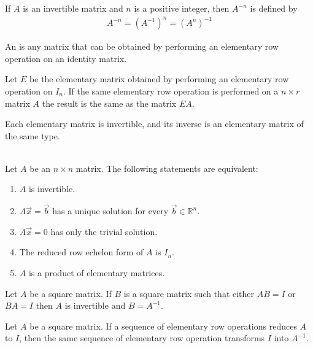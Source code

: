\documentclass{article}
\begin{document}
\begin{definition}
    If $A$ is an invertible matrix and $n$ is a positive integer, then $A^{-n}$ is defined by 
    \begin{gather*}
        A^{-n} = (A^{-1})^n = (A^n)^{-1}
    \end{gather*}
\end{definition}
\begin{definition}
    An  is any matrix that can be obtained by performing an elementary row operation on an identity matrix. 
\end{definition}
\begin{theorem}
    Let $E$ be the elementary matrix obtained by performing an elementary row operation on $I_n$. If the same elementary row operation is performed on a $n\times r$ matrix $A$ the result is the same as the matrix $EA$.
\end{theorem}
\begin{theorem}
    Each elementary matrix is invertible, and its inverse is an elementary matrix of the same type.
\end{theorem}
\begin{theorem}
    \\
    Let $A$ be an $n\times n$ matrix. The following statements are equivalent:
    \begin{enumerate}
        \item $A$ is invertible.
        \item $A\vec x = \vec b$ has a unique solution for every $\vec b\in\mathbb{R}^n$.
        \item $A\vec x = 0$ has only the trivial solution.
        \item The reduced row echelon form of $A$ is $I_n$.
        \item $A$ is a product of elementary matrices.
    \end{enumerate}
\end{theorem}
\begin{theorem}
    Let $A$ be a square matrix. If $B$ is a square matrix such that either $AB=I$ or $BA=I$ then $A$ is invertible and $B=A^{-1}$.
\end{theorem}
\begin{theorem}
    Let $A$ be a square matrix. If a sequence of elementary row operations reduces $A$ to $I$, then the same sequence of elementary row operation transforms $I$ into $A^{-1}$.
\end{theorem}
\end{document}
